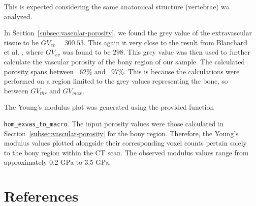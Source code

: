 \documentclass[a4paper,12pt]{article}
\begin{document}
    This is expected considering the same anatomical structure (vertebrae) wa analyzed.

    \vspace{10pt}
    In Section~\ref{subsec:vascular-porosity}, we found the grey value of the extravascular tissue to be $GV_{ev} = 300.53$.
    This again it very close to the result from Blanchard et al. \cite{blanchard2016patient}, where $GV_{ev}$ was found to be $298$.
    This grey value was then used to further calculate the vascular porosity of the bony region of our sample.
    The calculated porosity spans between ~62\% and ~97\%.
    This is because the calculations were performed on a region limited to the grey values representing the bone, so between $GV_{thr}$ and $GV_{max}$.

    \vspace{10pt}
    The Young's modulus plot was generated using the provided function

    \vspace{1pt}
    \texttt{hom\_exvas\_to\_macro}.
    The input porosity values were those calculated in Section~\ref{subsec:vascular-porosity} for the bony region.
    Therefore, the Young's modulus values plotted alongside their corresponding voxel counts pertain solely to the bony region within the CT scan.
    The observed modulus values range from approximately 0.2 GPa to 3.5 GPa.

    \newpage


    \section{References}\label{sec:references}
    \begingroup
    \renewcommand{\section}[2]{}
    
    
    \endgroup
\end{document}

